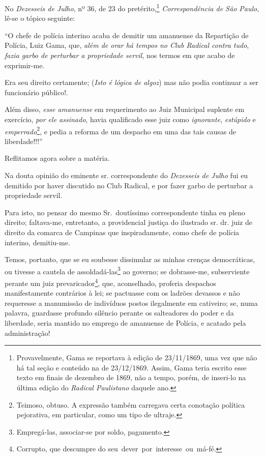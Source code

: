 \asterisc{}

No \emph{Dezesseis de Julho}, nº 36, de 23 do pretérito,\footnote{
  Provavelmente, Gama se reportava à edição de 23/11/1869, uma vez que
  não há tal seção e conteúdo na de 23/12/1869. Assim, Gama teria
  escrito esse texto em finais de dezembro de 1869, não a tempo, porém,
  de inseri-lo na última edição do \emph{Radical Paulistano} daquele
  ano.} \emph{Correspondência de São Paulo}, lê-se o tópico seguinte:

``O chefe de polícia interino acaba de demitir um amanuense da Repartição
de Polícia, Luiz Gama, que, \emph{além de orar há tempos no Club Radical
contra tudo}, \emph{fazia garbo de perturbar a propriedade servil}, nos
termos em que acabo de exprimir-me.

Era seu direito certamente; (\emph{Isto é lógica de algoz}) mas não
podia continuar a ser funcionário público!.

Além disso, \emph{esse amanuense} em requerimento ao Juiz Municipal
suplente em exercício, \emph{por ele assinado}, havia qualificado esse
juiz como \emph{ignorante}, \emph{estúpido} e
\emph{emperrado}\footnote{ Teimoso, obtuso. A expressão também
  carregava certa conotação política pejorativa, em particular, como um
  tipo de ultraje.}, e pedia a reforma de um despacho em uma das tais 
  causas de liberdade!!!''

Reflitamos agora sobre a matéria.

Na douta opinião do eminente sr. correspondente do \emph{Dezesseis de
Julho} fui eu demitido por haver discutido no Club Radical, e por fazer
garbo de perturbar a propriedade servil.

Para isto, no pensar do mesmo Sr.~doutíssimo correspondente tinha eu
pleno direito; faltava-me, entretanto, a providencial justiça do
ilustrado sr. dr. juiz de direito da comarca de Campinas que
inspiradamente, como chefe de polícia interino, demitiu-me.

Temos, portanto, que se eu soubesse dissimular as minhas crenças
democráticas, ou tivesse a cautela de assoldadá-las\footnote{
  Empregá-las, associar-se por soldo, pagamento.} ao governo; se
dobrasse-me, subserviente perante um juiz prevaricador\footnote{
  Corrupto, que descumpre do seu~dever~por~interesse~ou~má-fé.}, que,
aconselhado, proferia despachos manifestamente contrários à lei; se
pactuasse com os ladrões devassos e não requeresse a manumissão de
indivíduos postos ilegalmente em cativeiro; se, numa palavra, guardasse
profundo silêncio perante os salteadores do poder e da liberdade, seria
mantido no emprego de amanuense de Polícia, e acatado pela
administração!


